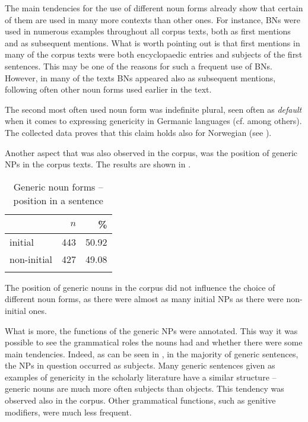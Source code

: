 \documentclass[output=paper]{langsci/langscibook}
\begin{document}
The main tendencies for the use of different noun forms already show that certain of them are used in many more contexts than other ones. For instance, BNs were used in numerous examples throughout all corpus texts, both as first mentions and as subsequent mentions. What is worth pointing out is that first mentions in many of the corpus texts were both encyclopaedic entries and subjects of the first sentences. This may be one of the reasons for such a frequent use of BNs. However, in many of the texts BNs appeared also as subsequent mentions, following often other noun forms used earlier in the text.

The second most often used noun form was indefinite plural, seen often as \textit{default} when it comes to expressing genericity in Germanic languages (cf. \citealp{Carlson1977,GenBook1995, Chierchia1998,Pettersson1976} among others). The collected data proves that this claim holds also for Norwegian (see ).

Another aspect that was also observed in the corpus, was the position of generic NPs in the corpus texts. The results are shown in .
 
\begin{table}
\caption{Generic noun forms -- position in a sentence\label{tab:position}}
\begin{tabular}{lrr} 
\lsptoprule
                    & $n$    & \%  \\ 
   \midrule
   initial          &  443  &   50.92   \\
   non-initial      &  427 &   49.08 \\
   \lspbottomrule
  \end{tabular}
 \end{table}
 
The position of generic nouns in the corpus did not influence the choice of different noun forms, as there were almost as many initial NPs as there were non-initial ones.

What is more, the functions of the generic NPs were annotated. This way it was possible to see the grammatical roles the nouns had and whether there were some main tendencies. Indeed, as can be seen in , in the majority of generic sentences, the NPs in question occurred as subjects. Many generic sentences given as examples of genericity in the scholarly literature have a similar structure -- generic nouns are much more often subjects than objects. This tendency was observed also in the corpus. Other grammatical functions, such as genitive modifiers, were much less frequent.
\end{document}
